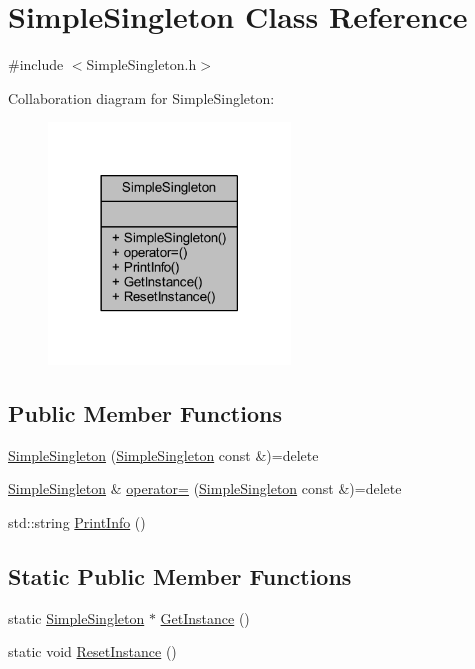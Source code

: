 \hypertarget{class_simple_singleton}{}\section{Simple\+Singleton Class Reference}
\label{class_simple_singleton}


{\ttfamily \#include $<$Simple\+Singleton.\+h$>$}



Collaboration diagram for Simple\+Singleton\+:
\nopagebreak
\begin{figure}[H]
\begin{center}
\leavevmode
\includegraphics[width=182pt]{class_simple_singleton__coll__graph}
\end{center}
\end{figure}
\subsection*{Public Member Functions}
\begin{DoxyCompactItemize}
\item 
\mbox{\hyperlink{class_simple_singleton_aeb57c1d8ea17414c1d33ca5e80d1d91d}{Simple\+Singleton}} (\mbox{\hyperlink{class_simple_singleton}{Simple\+Singleton}} const \&)=delete
\item 
\mbox{\hyperlink{class_simple_singleton}{Simple\+Singleton}} \& \mbox{\hyperlink{class_simple_singleton_a5484acd9fdcd902b242ee5e557d6d265}{operator=}} (\mbox{\hyperlink{class_simple_singleton}{Simple\+Singleton}} const \&)=delete
\item 
std\+::string \mbox{\hyperlink{class_simple_singleton_a31826b918981462cc7d2ef0b7261082a}{Print\+Info}} ()
\end{DoxyCompactItemize}
\subsection*{Static Public Member Functions}
\begin{DoxyCompactItemize}
\item 
static \mbox{\hyperlink{class_simple_singleton}{Simple\+Singleton}} $\ast$ \mbox{\hyperlink{class_simple_singleton_af967f13cf4b29765becf0ef7cfb703ad}{Get\+Instance}} ()
\item 
static void \mbox{\hyperlink{class_simple_singleton_a81614f1e12c738b592cb7ec6339dbeed}{Reset\+Instance}} ()
\end{DoxyCompactItemize}


